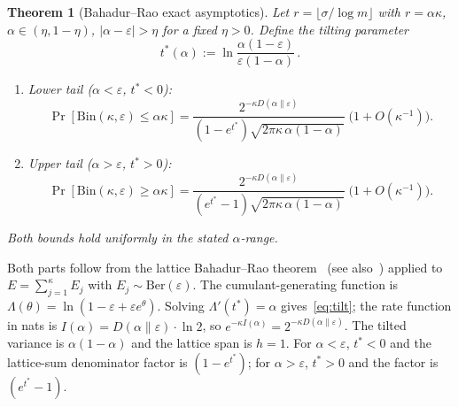 \documentclass[journal]{IEEEtran}
\makeatletter
\newtheorem{theorem}{Theorem}[section]
\numberwithin{equation}{section}
\renewenvironment{proof}[1][\proofname]{\par
  \pushQED{\qed}%
  \normalfont \topsep6\p@\@plus6\p@\relax
  \trivlist
  \item[\hskip\labelsep
        \itshape
    #1\@addpunct{.}]\ignorespaces
}{%
  \popQED\endtrivlist\@endpefalse
}
\makeatother
\begin{document}
\begin{theorem}[Bahadur--Rao exact asymptotics]
\label{thm:bahadur-rao}
Let $r=\lfloor\sigma/\log m\rfloor$ with
$r=\alpha\kappa$,
$\alpha\in(\eta,1{-}\eta)$,
$|\alpha-\varepsilon|>\eta$
for a fixed $\eta>0$.
Define the tilting parameter
\begin{equation}\label{eq:tilt}
  t^*(\alpha)
  :=\ln\frac{\alpha(1{-}\varepsilon)}
             {\varepsilon(1{-}\alpha)}\,.
\end{equation}

\begin{enumerate}[label=\textup{(\roman*)}]
\item \emph{Lower tail}
\textup{(}$\alpha<\varepsilon$, $t^*<0$\textup{)}:
\begin{equation}\label{eq:bahadur-rao}
  \Pr[\mathrm{Bin}(\kappa,\varepsilon)\le\alpha\kappa]
  =\frac{2^{-\kappa D(\alpha\|\varepsilon)}}
        {(1{-}e^{t^*})
         \sqrt{2\pi\kappa\,\alpha(1{-}\alpha)}}\;
  \bigl(1+O(\kappa^{-1})\bigr).
\end{equation}

\item \emph{Upper tail}
\textup{(}$\alpha>\varepsilon$, $t^*>0$\textup{)}:
\begin{equation}\label{eq:bahadur-rao-upper}
  \Pr[\mathrm{Bin}(\kappa,\varepsilon)\ge\alpha\kappa]
  =\frac{2^{-\kappa D(\alpha\|\varepsilon)}}
        {(e^{t^*}{-}1)
         \sqrt{2\pi\kappa\,\alpha(1{-}\alpha)}}\;
  \bigl(1+O(\kappa^{-1})\bigr).
\end{equation}
\end{enumerate}
Both bounds hold uniformly in the stated $\alpha$-range.
\end{theorem}

\begin{proof}
Both parts follow from the lattice Bahadur--Rao
theorem~\cite{bahadur1960deviations}
(see also~\cite[Theorem~3.7.4]{dembo2009large})
applied to
$E=\sum_{j=1}^\kappa E_j$ with
$E_j\sim\mathrm{Ber}(\varepsilon)$.
The cumulant-generating function is
$\Lambda(\theta)=\ln(1{-}\varepsilon{+}\varepsilon e^\theta)$.
Solving $\Lambda'(t^*)=\alpha$ gives~\eqref{eq:tilt};
the rate function in nats is
$I(\alpha)=D(\alpha\|\varepsilon)\cdot\ln 2$,
so $e^{-\kappa I(\alpha)}=2^{-\kappa D(\alpha\|\varepsilon)}$.
The tilted variance is $\alpha(1{-}\alpha)$ and the
lattice span is $h=1$.
For $\alpha<\varepsilon$, $t^*<0$ and the lattice-sum
denominator factor is $(1{-}e^{t^*})$;
for $\alpha>\varepsilon$, $t^*>0$ and the factor is
$(e^{t^*}{-}1)$.
\end{proof}
\end{document}
